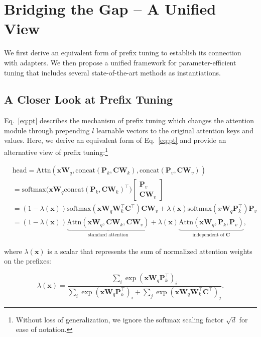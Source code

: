 \section{Bridging the Gap -- A Unified View} We first derive an equivalent form of prefix tuning to establish its connection with adapters. We then propose a unified framework for parameter-efficient tuning that includes several state-of-the-art methods as instantiations.

\subsection{A Closer Look at Prefix Tuning}
\label{sec:connection}
\label{sec:reinter-prefix}
Eq.~\ref{eq:pt} describes the mechanism of prefix tuning which changes the attention module through prepending $l$ learnable vectors to the original attention keys and values. Here, we derive an equivalent form of Eq.~\ref{eq:pt} and provide an alternative view of prefix tuning:\footnote{Without loss of generalization, we ignore the softmax scaling factor $\sqrt{d}$ for ease of notation.}

\begin{equation}
\label{eq:prefix-adapter}
\begin{split}
& \text{head} = \text{Attn}({\bm{x}}{\bm{W}}_q, \text{concat}({\bm{P}}_k, {\bm{C}}{\bm{W}}_k), \text{concat}({\bm{P}}_v, {\bm{C}}{\bm{W}}_v)) \\
& = \text{softmax}\big({\bm{x}}{\bm{W}}_q\text{concat}({\bm{P}}_k, {\bm{C}}{\bm{W}}_k)^\top\big) \begin{bmatrix} {\bm{P}}_v \\ {\bm{C}}{\bm{W}}_v \end{bmatrix} \\
& = (1 - \lambda({\bm{x}})) \text{softmax}({\bm{x}}{\bm{W}}_q{\bm{W}}_k^\top{\bm{C}}^\top){\bm{C}}{\bm{W}}_v + \lambda({\bm{x}})\text{softmax}(x{\bm{W}}_q{\bm{P}}_k^\top){\bm{P}}_v \\
& = (1 - \lambda({\bm{x}})) \underbrace{ \text{Attn}({\bm{x}}{\bm{W}}_q, {\bm{C}}{\bm{W}}_k, {\bm{C}}{\bm{W}}_v) }_{\text{standard attention}} + \lambda({\bm{x}}) \underbrace{ \text{Attn}({\bm{x}}{\bm{W}}_q, {\bm{P}}_k, {\bm{P}}_v) }_{\text{independent of }{\bm{C}}},
\end{split}
\end{equation}

where $\lambda({\bm{x}})$ is a scalar that represents the sum of normalized attention weights on the prefixes:

\begin{equation}
\lambda({\bm{x}}) = \frac{\sum_i\exp ({\bm{x}}{\bm{W}}_q{\bm{P}}_k^\top)_i}{\sum_i \exp ({\bm{x}}{\bm{W}}_q{\bm{P}}_k^\top)_i + \sum_j \exp({\bm{x}}{\bm{W}}_q{\bm{W}}_k^\top{\bm{C}}^\top)_j}.
\end{equation}

